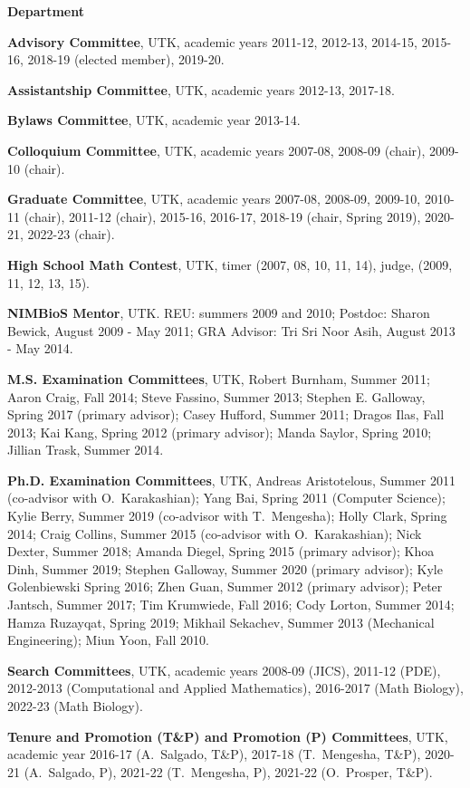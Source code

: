 \documentclass[11pt]{letter}
\begin{document}
\begin{description}
	\item
{\Large\bf Department}
    \begin{description}
    \item
\textbf{Advisory Committee}, UTK, academic years 2011-12, 2012-13, 2014-15, 2015-16, 2018-19 (elected member), 2019-20.
    \item
\textbf{Assistantship Committee}, UTK, academic years 2012-13, 2017-18.
    \item
\textbf{Bylaws Committee}, UTK, academic year 2013-14.
	\item
\textbf{Colloquium Committee}, UTK, academic years 2007-08, 2008-09 (chair), 2009-10 (chair).
    \item
\textbf{Graduate Committee}, UTK, academic years 2007-08, 2008-09, 2009-10, 2010-11 (chair), 2011-12 (chair), 2015-16, 2016-17, 2018-19 (chair, Spring 2019), 2020-21, 2022-23 (chair).
    \item
\textbf{High School Math Contest}, UTK, timer (2007, 08, 10, 11, 14), judge, (2009, 11, 12, 13, 15).
    \item
\textbf{NIMBioS Mentor}, UTK. REU: summers 2009 and 2010; Postdoc: Sharon Bewick, August 2009 - May 2011; GRA Advisor: Tri Sri Noor Asih, August 2013 - May 2014.
	\item
\textbf{M.S. Examination Committees}, UTK, Robert Burnham, Summer 2011; Aaron Craig, Fall 2014; Steve Fassino, Summer 2013; Stephen E. Galloway, Spring 2017 (primary advisor); Casey Hufford, Summer 2011; Dragos Ilas, Fall 2013; Kai Kang, Spring 2012 (primary advisor); Manda Saylor, Spring 2010; Jillian Trask, Summer 2014.
	\item
\textbf{Ph.D. Examination Committees}, UTK, Andreas Aristotelous, Summer 2011 (co-advisor with O.~Karakashian); Yang Bai, Spring 2011 (Computer Science); Kylie Berry, Summer 2019 (co-advisor with T.~Mengesha); Holly Clark,  Spring 2014; Craig Collins, Summer 2015 (co-advisor with O.~Karakashian); Nick Dexter, Summer 2018; Amanda Diegel, Spring 2015 (primary advisor); Khoa Dinh, Summer 2019; Stephen Galloway, Summer 2020 (primary advisor); Kyle Golenbiewski Spring 2016; Zhen Guan, Summer 2012 (primary advisor); Peter Jantsch, Summer 2017; Tim Krumwiede, Fall 2016; Cody Lorton, Summer 2014; Hamza Ruzayqat, Spring 2019; Mikhail Sekachev, Summer 2013 (Mechanical Engineering); Miun Yoon, Fall 2010.
	\item
\textbf{Search Committees}, UTK, academic years 2008-09 (JICS), 2011-12 (PDE), 2012-2013 (Computational and Applied Mathematics), 2016-2017 (Math Biology), 2022-23 (Math Biology).
	\item
\textbf{Tenure and Promotion (T\&P) and Promotion (P) Committees}, UTK, academic year 2016-17 (A.~Salgado, T\&P), 2017-18 (T.~Mengesha, T\&P), 2020-21 (A.~Salgado, P), 2021-22 (T.~Mengesha, P), 2021-22 (O.~Prosper, T\&P).


\end{description}
\end{description}
\end{document}

